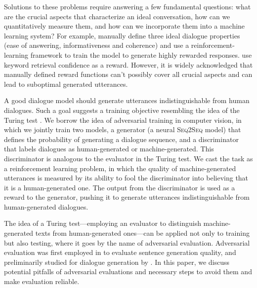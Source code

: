 \documentclass[11pt]{article}
\newcommand{\sts}{{{\textsc{Seq2Seq}}}\xspace}
\begin{document}
Solutions to these problems require answering a few fundamental questions: 
what are the crucial aspects that characterize an ideal conversation, how can we quantitatively measure them, and how can we incorporate them into 
a machine learning system? 
For example, 
 manually define three ideal dialogue properties (ease of answering, informativeness and coherence) and use a reinforcement-learning framework to train the model to generate highly rewarded responses. 
 use keyword retrieval confidence as a reward. 
However, 
it is widely
acknowledged that  
manually defined reward functions can't possibly
cover all crucial aspects and can lead to suboptimal generated utterances. 

A good dialogue model should generate utterances indistinguishable from human dialogues.
Such a goal suggests a training objective 
resembling the idea of the Turing test \cite{turing1950computing}.
We borrow the idea of adversarial training \cite{goodfellow2014generative,denton2015deep} in 
computer
vision, in which we jointly train two models, 
a generator (a neural  \sts model) that defines the probability of generating a dialogue sequence, and 
a discriminator
that labels dialogues as human-generated or machine-generated. 
This discriminator  is analogous to  the evaluator in the Turing test.
We cast the task as a reinforcement learning problem, in which the quality of machine-generated utterances is measured by its ability to fool the discriminator into believing that it is a human-generated one. The output from the discriminator is used as a reward to the generator, pushing it to generate 
utterances indistinguishable from human-generated dialogues. 

The idea of a Turing test---employing an evaluator 
to distinguish  machine-generated texts from human-generated
ones---can be applied not only to training but also testing,
where it goes by the name of adversarial evaluation. Adversarial
evaluation was first employed in  to evaluate sentence generation quality, and preliminarily studied for dialogue generation by . 
In this paper, we discuss potential pitfalls of adversarial evaluations and 
  necessary steps to avoid them and make evaluation reliable. 


\begin{comment}
Another important insight from the Turing test is that in the Turing test, a human evaluator  needs to talk with the machine for 5 minutes\footnote{\url{https://en.wikipedia.org/wiki/Turing_test}} rather than a single turn. 
This indicates that the discriminator in adversarial training will benefit from multi-turn dialogue classification.\footnote{Neural \sts models  are already capable of generating high-quality single-turn dialogue utterances \cite{li2016deep}. This is expected, since the models are trained to directly produce the immediate next utterance.}
To achieve this goal, we simulate conversations between two bots as in \cite{li2016deep} and ask the discriminator to  give  labels to multi-turn dialogues generated from machines and humans. 
\end{comment}
\end{document}
